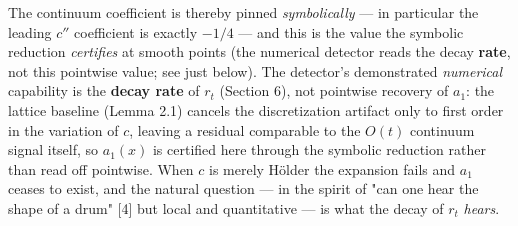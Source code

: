 \documentclass[11pt]{article}
\begin{document}
The continuum coefficient is thereby pinned \emph{symbolically} — in particular the leading $c''$ coefficient is exactly $-1/4$ — and this is the value the symbolic reduction \emph{certifies} at smooth points (the numerical detector reads the decay \textbf{rate}, not this pointwise value; see just below).  The detector's demonstrated \emph{numerical} capability is the \textbf{decay rate} of $r_t$ (Section 6), not pointwise recovery of $a_1$: the lattice baseline (Lemma 2.1) cancels the discretization artifact only to first order in the variation of $c$, leaving a residual comparable to the $O(t)$ continuum signal itself, so $a_1(x)$ is certified here through the symbolic reduction rather than read off pointwise.  When $c$ is merely Hölder the expansion fails and $a_1$ ceases to exist, and the natural question — in the spirit of "can one hear the shape of a drum" [4] but local and quantitative — is what the decay of $r_t$ \emph{hears}.
\end{document}
